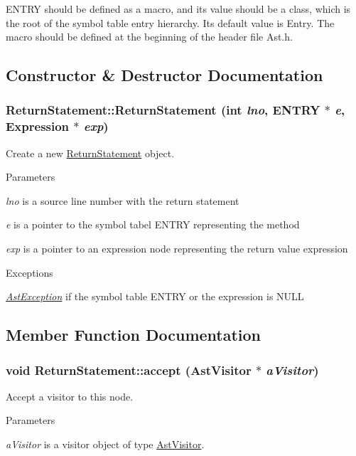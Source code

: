 ENTRY should be defined as a macro, and its value should be a class, which is the root of the symbol table entry hierarchy. Its default value is Entry. The macro should be defined at the beginning of the header file Ast.h. 

\subsection{Constructor \& Destructor Documentation}
\hypertarget{classReturnStatement_a24684312040304edbc031695431317ff}{
\subsubsection[{ReturnStatement}]{\setlength{\rightskip}{0pt plus 5cm}ReturnStatement::ReturnStatement (int {\em lno}, \/  ENTRY $\ast$ {\em e}, \/  {\bf Expression} $\ast$ {\em exp})}}
\label{classReturnStatement_a24684312040304edbc031695431317ff}
Create a new \hyperlink{classReturnStatement}{ReturnStatement} object.


\begin{DoxyParams}{Parameters}
\item[{\em lno}]is a source line number with the return statement \item[{\em e}]is a pointer to the symbol tabel ENTRY representing the method \item[{\em exp}]is a pointer to an expression node representing the return value expression \end{DoxyParams}

\begin{DoxyExceptions}{Exceptions}
\item[{\em \hyperlink{classAstException}{AstException}}]if the symbol table ENTRY or the expression is NULL \end{DoxyExceptions}


\subsection{Member Function Documentation}
\hypertarget{classReturnStatement_a491cb39772b9054be31d27dbc0d72d0f}{
\subsubsection[{accept}]{\setlength{\rightskip}{0pt plus 5cm}void ReturnStatement::accept ({\bf AstVisitor} $\ast$ {\em aVisitor})}}
\label{classReturnStatement_a491cb39772b9054be31d27dbc0d72d0f}
Accept a visitor to this node. 
\begin{DoxyParams}{Parameters}
\item[{\em aVisitor}]is a visitor object of type \hyperlink{classAstVisitor}{AstVisitor}. \end{DoxyParams}


